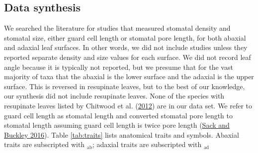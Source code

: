 \documentclass[
  12pt,
]{article}
\begin{document}
\hypertarget{data-synthesis}{%
\subsection{Data synthesis}\label{data-synthesis}}

We searched the literature for studies that measured stomatal density and stomatal size, either guard cell length or stomatal pore length, for both abaxial and adaxial leaf surfaces. In other words, we did not include studies unless they reported separate density and size values for each surface. We did not record leaf angle because it is typically not reported, but we presume that for the vast majority of taxa that the abaxial is the lower surface and the adaxial is the upper surface. This is reversed in resupinate leaves, but to the best of our knowledge, our synthesis did not include resupinate leaves. None of the species with resupinate leaves listed by Chitwood et al. (\protect\hyperlink{ref-chitwood_conflict_2012}{2012}) are in our data set. We refer to guard cell length as stomatal length and converted stomatal pore length to stomatal length assuming guard cell length is twice pore length (\protect\hyperlink{ref-sack_developmental_2016}{Sack and Buckley 2016}). Table \ref{tab:traits} lists anatomical traits and symbols. Abaxial traits are subscripted with \(_{\textrm{ab}}\); adaxial traits are subscripted with \(_{\textrm{ad}}\)
\end{document}
